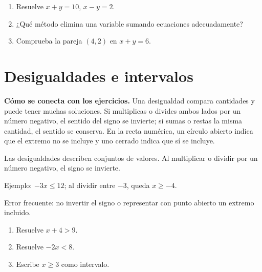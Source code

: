 \documentclass[10pt,oneside,openany]{book}
\begin{document}
\begin{practica}

\begin{enumerate}

\item Resuelve $x+y=10$, $x-y=2$.

\item ¿Qué método elimina una variable sumando ecuaciones adecuadamente?

\item Comprueba la pareja $(4,2)$ en $x+y=6$.

\end{enumerate}

\end{practica}



\section{Desigualdades e intervalos}

\textbf{Cómo se conecta con los ejercicios.} Una desigualdad compara cantidades y puede tener muchas soluciones. Si multiplicas o divides ambos lados por un número negativo, el sentido del signo se invierte; si sumas o restas la misma cantidad, el sentido se conserva. En la recta numérica, un círculo abierto indica que el extremo no se incluye y uno cerrado indica que sí se incluye.

Las desigualdades describen conjuntos de valores. Al multiplicar o dividir por un número negativo, el signo se invierte.

\begin{ejemplo}
Ejemplo: $-3x\leq12$; al dividir entre $-3$, queda $x\geq-4$.
\end{ejemplo}

\begin{ojo}
Error frecuente: no invertir el signo o representar con punto abierto un extremo incluido.
\end{ojo}

\begin{practica}

\begin{enumerate}

\item Resuelve $x+4>9$.

\item Resuelve $-2x<8$.

\item Escribe $x\geq3$ como intervalo.

\end{enumerate}

\end{practica}
\end{document}

